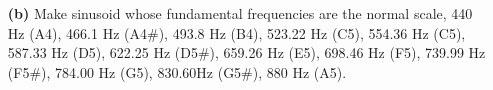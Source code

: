 \documentclass[a4paper, 12pt]{article}
\begin{document}
\begin{itemize}
\begin{itemize}
\pagebreak

\item[\textbf{(b)}]{Make sinusoid whose fundamental frequencies are the normal scale, 440 Hz (A4), 466.1 Hz (A4\#), 493.8 Hz (B4), 523.22 Hz (C5), 554.36 Hz (C5), 587.33 Hz (D5), 622.25 Hz (D5\#), 659.26 Hz (E5), 698.46 Hz (F5), 739.99 Hz (F5\#), 784.00 Hz (G5), 830.60Hz (G5\#), 880 Hz (A5).}

\begin{tcolorbox}[enforce breakable, pad at break = 1mm, break at=20cm,title={Source Code}]

\end{tcolorbox}

\pagebreak
\begin{figure}[h!]
\end{figure}

\begin{figure}[h!]
\end{figure}


\end{itemize}
\end{itemize}
\end{document}
